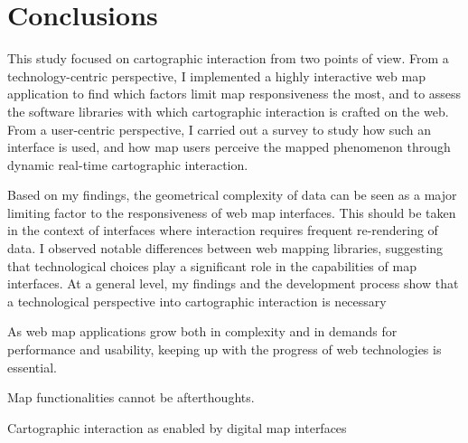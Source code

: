 \section{Conclusions}

This study focused on cartographic interaction from two points of view.
From a technology-centric perspective,
I implemented a highly interactive web map application to
find which factors limit map responsiveness the most,
and to assess the software libraries with which cartographic interaction is crafted on the web.
From a user-centric perspective, I carried out a survey to
study how such an interface is used,
and how map users perceive the mapped phenomenon
through dynamic real-time cartographic interaction.

Based on my findings,
the geometrical complexity of data can be seen as a
major limiting factor to the responsiveness of web map interfaces.
This should be taken in the context of interfaces where interaction requires
frequent re-rendering of data.
I observed notable differences between web mapping libraries,
suggesting that technological choices play a significant role
in the capabilities of map interfaces.
At a general level,
my findings and the development process show that a
technological perspective into cartographic interaction
is necessary

As web map applications grow both in complexity and in demands for performance and usability,
keeping up with the progress of web technologies is essential.

Map functionalities cannot be afterthoughts.

Cartographic interaction as enabled by digital map interfaces
